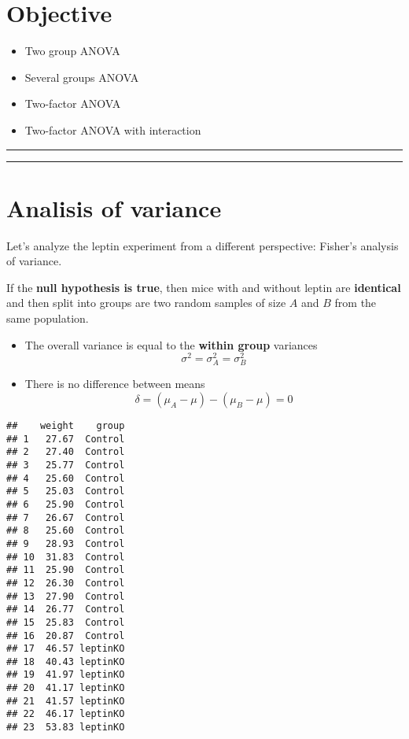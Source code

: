 \documentclass[
]{book}
\providecommand{\tightlist}{%
  \setlength{\itemsep}{0pt}\setlength{\parskip}{0pt}}
\begin{document}
\hypertarget{objective-16}{%
\section{Objective}\label{objective-16}}

\begin{itemize}
\tightlist
\item
  Two group ANOVA
\item
  Several groups ANOVA
\item
  Two-factor ANOVA
\item
  Two-factor ANOVA with interaction
\end{itemize}

\begin{center}\rule{0.5\linewidth}{0.5pt}\end{center}

\begin{center}\rule{0.5\linewidth}{0.5pt}\end{center}

\hypertarget{analisis-of-variance}{%
\section{Analisis of variance}\label{analisis-of-variance}}

Let's analyze the leptin experiment from a different perspective: Fisher's analysis of variance.

If the \textbf{null hypothesis is true}, then mice with and without leptin are \textbf{identical} and then split into groups are two random samples of size \(A\) and \(B\) from the same population.

\begin{itemize}
\item
  The overall variance is equal to the \textbf{within group} variances \[\sigma^2=\sigma^2_A=\sigma^2_B\]
\item
  There is no difference between means \[\delta=(\mu_A-\mu)-(\mu_B-\mu)=0\]
\end{itemize}

\begin{verbatim}
##    weight    group
## 1   27.67  Control
## 2   27.40  Control
## 3   25.77  Control
## 4   25.60  Control
## 5   25.03  Control
## 6   25.90  Control
## 7   26.67  Control
## 8   25.60  Control
## 9   28.93  Control
## 10  31.83  Control
## 11  25.90  Control
## 12  26.30  Control
## 13  27.90  Control
## 14  26.77  Control
## 15  25.83  Control
## 16  20.87  Control
## 17  46.57 leptinKO
## 18  40.43 leptinKO
## 19  41.97 leptinKO
## 20  41.17 leptinKO
## 21  41.57 leptinKO
## 22  46.17 leptinKO
## 23  53.83 leptinKO
\end{verbatim}
\end{document}
